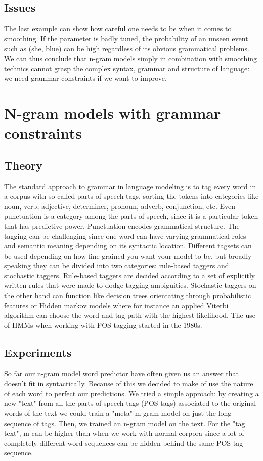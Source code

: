 \documentclass[a4paper,12pt]{article}
\begin{document}
\subsection{Issues}
	The last example can show how careful one needs to be when it comes to smoothing. If the parameter is badly tuned, the probability of an unseen event such as (she, blue) can be high regardless of its obvious grammatical problems. We can thus conclude that n-gram models simply in combination with smoothing technics cannot grasp the complex syntax, grammar and structure of language: we need grammar constraints if we want to improve.


\section{N-gram models with grammar constraints}
\label{sec:ngramgrammar}

\subsection{Theory}

The standard approach to grammar in language modeling is to tag every word in a corpus with so called parts-of-speech-tags, sorting the tokens into categories like noun, verb, adjective, determiner, pronoun, adverb, conjunction, etc. Even punctuation is a category among the parts-of-speech, since it is a particular token that has predictive power. Punctuation encodes grammatical structure. The tagging can be challenging since one word can have varying grammatical roles and semantic meaning depending on its syntactic location. Different tagsets can be used depending on how fine grained you want your model to be, but broadly speaking they can be divided into two categories: rule-based taggers and stochastic taggers. Rule-based taggers are decided according to a set of explicitly written rules that were made to dodge tagging ambiguities. Stochastic taggers on the other hand can function like decision trees orientating through probabilistic features or Hidden markov models where for instance an applied Viterbi algorithm can choose the word-and-tag-path with the highest likelihood. The use of HMMs when working with POS-tagging started in the 1980s. 

\subsection{Experiments}

So far our n-gram model word predictor have often given us an answer that doesn't fit in syntactically. Because of this we decided to make of use the nature of each word to perfect our predictions. We tried a simple approach: by creating a new "text" from all the parts-of-speech-tags (POS-tags) associated to the original words of the text we could train a "meta" m-gram model on just the long sequence of tags. Then, we trained an n-gram model on the text. For the "tag text", m can be higher than when we work with normal corpora since a lot of completely different word sequences can be hidden behind the same POS-tag sequence.
\end{document}
